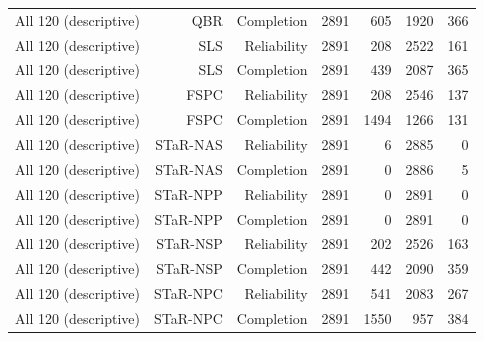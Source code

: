 \begin{longtable}{@{}lrrrrrr@{}}
All 120 (descriptive) & QBR & Completion & 2891 & 605 & 1920 & 366 \\
All 120 (descriptive) & SLS & Reliability & 2891 & 208 & 2522 & 161 \\
All 120 (descriptive) & SLS & Completion & 2891 & 439 & 2087 & 365 \\
All 120 (descriptive) & FSPC & Reliability & 2891 & 208 & 2546 & 137 \\
All 120 (descriptive) & FSPC & Completion & 2891 & 1494 & 1266 & 131 \\
All 120 (descriptive) & STaR-NAS & Reliability & 2891 & 6 & 2885 & 0 \\
All 120 (descriptive) & STaR-NAS & Completion & 2891 & 0 & 2886 & 5 \\
All 120 (descriptive) & STaR-NPP & Reliability & 2891 & 0 & 2891 & 0 \\
All 120 (descriptive) & STaR-NPP & Completion & 2891 & 0 & 2891 & 0 \\
All 120 (descriptive) & STaR-NSP & Reliability & 2891 & 202 & 2526 & 163 \\
All 120 (descriptive) & STaR-NSP & Completion & 2891 & 442 & 2090 & 359 \\
All 120 (descriptive) & STaR-NPC & Reliability & 2891 & 541 & 2083 & 267 \\
All 120 (descriptive) & STaR-NPC & Completion & 2891 & 1550 & 957 & 384 \\
\bottomrule
\end{longtable}
\endgroup
